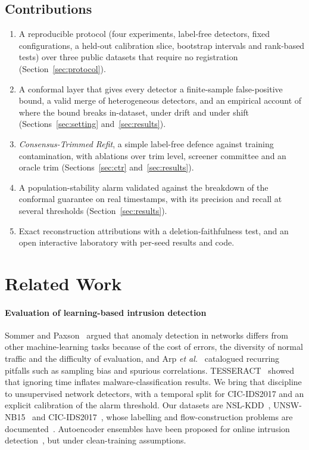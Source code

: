 \documentclass[journal]{IEEEtran}
\begin{document}
\subsection*{Contributions}
\begin{enumerate}
\item A reproducible protocol (four experiments, \nDetectors{} label-free detectors, fixed configurations, a held-out calibration slice, bootstrap intervals and rank-based tests) over three public datasets that require no registration (Section~\ref{sec:protocol}).
\item A conformal layer that gives every detector a finite-sample false-positive bound, a valid merge of heterogeneous detectors, and an empirical account of where the bound breaks in-dataset, under drift and under shift (Sections~\ref{sec:setting} and~\ref{sec:results}).
\item \emph{Consensus-Trimmed Refit}, a simple label-free defence against training contamination, with ablations over trim level, screener committee and an oracle trim (Sections~\ref{sec:ctr} and~\ref{sec:results}).
\item A population-stability alarm validated against the breakdown of the conformal guarantee on real timestamps, with its precision and recall at several thresholds (Section~\ref{sec:results}).
\item Exact reconstruction attributions with a deletion-faithfulness test, and an open interactive laboratory with per-seed results and code.
\end{enumerate}


\section{Related Work}
\label{sec:related}
\paragraph*{Evaluation of learning-based intrusion detection}
Sommer and Paxson~\cite{sommer2010} argued that anomaly detection in networks differs from other machine-learning tasks because of the cost of errors, the diversity of normal traffic and the difficulty of evaluation, and Arp \emph{et al.}~\cite{arp2022} catalogued recurring pitfalls such as sampling bias and spurious correlations. TESSERACT~\cite{pendlebury2019} showed that ignoring time inflates malware-classification results. We bring that discipline to unsupervised network detectors, with a temporal split for CIC-IDS2017 and an explicit calibration of the alarm threshold. Our datasets are NSL-KDD~\cite{tavallaee2009}, UNSW-NB15~\cite{moustafa2015} and CIC-IDS2017~\cite{sharafaldin2018}, whose labelling and flow-construction problems are documented~\cite{engelen2021}. Autoencoder ensembles have been proposed for online intrusion detection~\cite{mirsky2018}, but under clean-training assumptions.
\end{document}

